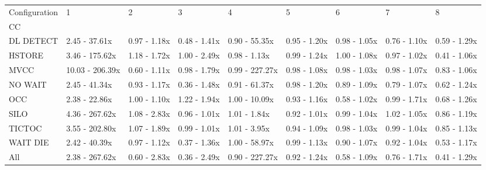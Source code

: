 \begin{tabular}{lllllllll}
\toprule
Configuration &                1 &             2 &             3 &               4 &             5 &             6 &             7 &             8 \\
CC        &                  &               &               &                 &               &               &               &               \\
\midrule
DL DETECT &    2.45 - 37.61x &  0.97 - 1.18x &  0.48 - 1.41x &   0.90 - 55.35x &  0.95 - 1.20x &  0.98 - 1.05x &  0.76 - 1.10x &  0.59 - 1.29x \\
HSTORE    &   3.46 - 175.62x &  1.18 - 1.72x &  1.00 - 2.49x &    0.98 - 1.13x &  0.99 - 1.24x &  1.00 - 1.08x &  0.97 - 1.02x &  0.41 - 1.06x \\
MVCC      &  10.03 - 206.39x &  0.60 - 1.11x &  0.98 - 1.79x &  0.99 - 227.27x &  0.98 - 1.08x &  0.98 - 1.03x &  0.98 - 1.07x &  0.83 - 1.06x \\
NO WAIT   &    2.45 - 41.34x &  0.93 - 1.17x &  0.36 - 1.48x &   0.91 - 61.37x &  0.98 - 1.20x &  0.89 - 1.09x &  0.79 - 1.07x &  0.62 - 1.24x \\
OCC       &    2.38 - 22.86x &  1.00 - 1.10x &  1.22 - 1.94x &   1.00 - 10.09x &  0.93 - 1.16x &  0.58 - 1.02x &  0.99 - 1.71x &  0.68 - 1.26x \\
SILO      &   4.36 - 267.62x &  1.08 - 2.83x &  0.96 - 1.01x &    1.01 - 1.84x &  0.92 - 1.01x &  0.99 - 1.04x &  1.02 - 1.05x &  0.86 - 1.19x \\
TICTOC    &   3.55 - 202.80x &  1.07 - 1.89x &  0.99 - 1.01x &    1.01 - 3.95x &  0.94 - 1.09x &  0.98 - 1.03x &  0.99 - 1.04x &  0.85 - 1.13x \\
WAIT DIE  &    2.42 - 40.39x &  0.97 - 1.12x &  0.37 - 1.36x &   1.00 - 58.97x &  0.99 - 1.13x &  0.90 - 1.07x &  0.92 - 1.04x &  0.53 - 1.17x \\
All       &   2.38 - 267.62x &  0.60 - 2.83x &  0.36 - 2.49x &  0.90 - 227.27x &  0.92 - 1.24x &  0.58 - 1.09x &  0.76 - 1.71x &  0.41 - 1.29x \\
\bottomrule
\end{tabular}
